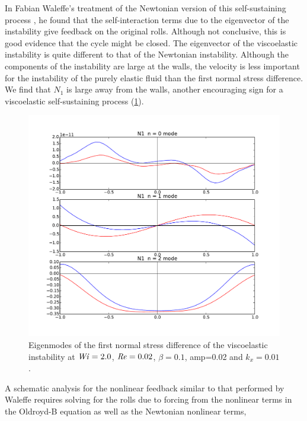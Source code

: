 \documentclass{jfm}
\newcommand\Wi{\mbox{\textit{Wi}}}
\newcommand\Rey{\mbox{\textit{Re}}}  %
\begin{document}
In Fabian Waleffe's treatment of the Newtonian version of this self-sustaining
process \cite{Waleffe1997}, he found that the self-interaction terms due to the
eigenvector of the instability give feedback on the original rolls. Although
not conclusive, this is good evidence that the cycle might be closed. The
eigenvector of the viscoelastic instability is quite different to that of the
Newtonian instability. Although the components of the instability are large at
the walls, the velocity is less important for the instability of the purely
elastic fluid than the first normal stress difference. We find that $N_{1}$ is
large away from the walls, another encouraging sign for a viscoelastic
self-sustaining process (\ref{fig:eigenmode_visco}). 

\begin{figure}
    \centering
    \includegraphics[width=\textwidth]{./figures/eigenmode_visco}
    \caption{
	Eigenmodes of the first normal stress difference of the viscoelastic
	instability at $\Wi = 2.0$, $\Rey = 0.02$, $\beta=0.1$, amp=0.02 and
	$k_x = 0.01$.
    }
    \label{fig:eigenmode_visco}
\end{figure}

A schematic analysis for the nonlinear feedback similar to that performed by
Waleffe \cite{Waleffe1997} requires solving for the rolls due to forcing from the
nonlinear terms in the Oldroyd-B equation as well as the Newtonian nonlinear terms,
\end{document}

